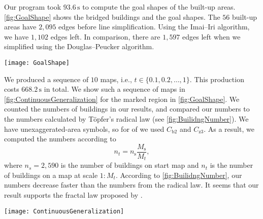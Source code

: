 Our program took $93.6\,\mathrm{s}$ 
to compute the goal shapes of the built-up areas.
\fig\ref{fig:GoalShape} shows the bridged buildings and the goal shapes.
The $56$ built-up areas have $2{,}095$ edges before line simplification.
Using the Imai--Iri algorithm, we have $1{,}102$ edges left.
In comparison, there are $1{,}597$ edges left when we simplified using
the Douglas--Peucker algorithm.

\begin{figure*}[tb]
	\centering
	\texttt{[image: GoalShape]}
	\caption{Bridged original buildings 
		and goal shapes of the built-up areas (without removing small holes), 
		at scale $1:50{,}000$.
		There are $56$ built-up areas, which have $1{,}102$ edges in total.
		We show a sequence of maps in \fig\ref{fig:ContinuousGeneralization} 
		for the region marked by the dashed circle.
	}
	\label{fig:GoalShape}
\end{figure*}


We produced a sequence of $10$ maps, i.e., $t \in \{0.1, 0.2, \dots, 1\}$.
This production costs $668.2\,\mathrm{s}$ in total.
We show such a sequence of maps in \fig\ref{fig:ContinuousGeneralization} for 
the marked region in \fig\ref{fig:GoalShape}.
We counted the numbers of buildings in our results,
and compared our numbers to the numbers calculated by T\"opfer's radical law
(see \fig\ref{fig:BuilidngNumber}).
We have unexaggerated-area symbols, 
so for  of \citet{Topfer1966} we used $C_\mathrm{b2}$ and $C_\mathrm{z3}$.
As a result, we computed the numbers according to
\[
n_t=n_\mathrm{s}\frac{M_\mathrm{s}}{M_t},
\]
where $n_s=2{,}590$ is the number of buildings on start map
and $n_t$ is the number of buildings on a map at scale $1:M_t$.
According to \fig\ref{fig:BuilidngNumber}, our numbers decrease faster than 
the numbers from the radical law.
It seems that our result supports the fractal law proposed by \citet{Jiang2015}.

\begin{figure*}[tb]
	\centering
	\texttt{[image: ContinuousGeneralization]}
	\caption{A sequence of maps at time $t \in \{0, 0.1, 0.2, \dots, 1\}$
		for the region marked in \fig\ref{fig:GoalShape}.
	}
	\label{fig:ContinuousGeneralization}
\end{figure*}

